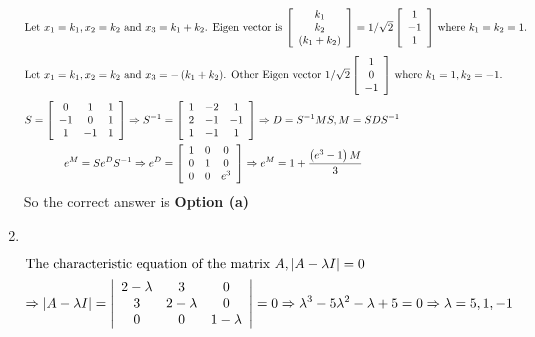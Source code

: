 \begin{enumerate}
\begin{answer}
\begin{align*}
		\intertext{Let $x_{1}=k_{1}, x_{2}=k_{2}$ and $x_{3}=k_{1}+k_{2}$. Eigen vector is $\left[\begin{array}{c}k_{1} \\ k_{2} \\ \left(k_{1}+k_{2}\right)\end{array}\right]=1 / \sqrt{2}\left[\begin{array}{c}1 \\ -1 \\ 1\end{array}\right]$ where $k_{1}=k_{2}=1$.}
		\intertext{Let $x_{1}=k_{1}, x_{2}=k_{2}$ and $x_{3}=-\left(k_{1}+k_{2}\right)$. Other Eigen vector $1 / \sqrt{2}\left[\begin{array}{c}1 \\ 0 \\ -1\end{array}\right]$ where $k_{1}=1, k_{2}=-1$.}
		S=\left[\begin{array}{ccc}0 & 1 & 1 \\ -1 & 0 & 1 \\ 1 & -1 & 1\end{array}\right] \Rightarrow S^{-1}&=\left[\begin{array}{ccc}1 & -2 & 1 \\ 2 & -1 & -1 \\ 1 & -1 & 1\end{array}\right] \Rightarrow D=S^{-1} M S, M=S D S^{-1}\\
		e^{M}=S e^{D} S^{-1} \Rightarrow e^{D}&=\left[\begin{array}{ccc}1 & 0 & 0 \\ 0 & 1 & 0 \\ 0 & 0 & e^{3}\end{array}\right] \Rightarrow e^{M}=1+\frac{\left(e^{3}-1\right) M}{3}
		\end{align*}
			So the correct answer is \textbf{Option (a)}
	\end{answer}
	\item $\left. \right. $	
	\begin{answer}
		\begin{align*}
		 \intertext{The characteristic equation of the matrix $A,|A-\lambda I|=0$}
		\Rightarrow|A-\lambda I|&=\left|\begin{array}{ccc}
		2-\lambda & 3 & 0 \\
		3 & 2-\lambda & 0 \\
		0 & 0 & 1-\lambda
		\end{array}\right|=0 \Rightarrow \lambda^{3}-5 \lambda^{2}-\lambda+5=0 \Rightarrow \lambda=5,1,-1

\end{align*}
\end{answer}
\end{enumerate}
